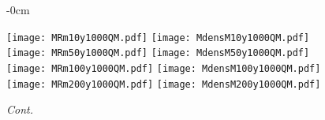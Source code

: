 \documentclass[universe,article,accept,moreauthors,pdftex]{Definitions/mdpi}
\begin{document}
\begin{figure}[H]\ContinuedFloat


\begin{adjustwidth}{-\extralength}{0cm}
\centering %

{\texttt{[image: MRm10y1000QM.pdf]}\vspace{3pt}
	  \texttt{[image: MdensM10y1000QM.pdf]}}\\\vspace{2pt}
{\texttt{[image: MRm50y1000QM.pdf]}\vspace{3pt}
	  \texttt{[image: MdensM50y1000QM.pdf]}}\\\vspace{2pt}
{\texttt{[image: MRm100y1000QM.pdf]}\vspace{3pt}
	  \texttt{[image: MdensM100y1000QM.pdf]}}\\\vspace{2pt}
{\texttt{[image: MRm200y1000QM.pdf]}\vspace{3pt}
	  \texttt{[image: MdensM200y1000QM.pdf]}}\\
\end{adjustwidth}
\caption{\emph{Cont.}}
\label{fig:MRdens1000QM}

\end{figure}
\end{document}
